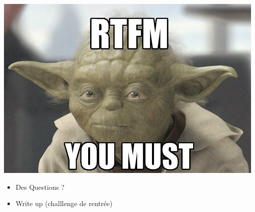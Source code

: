 \documentclass{beamer}
\begin{document}
\begin{frame}
	\centerline{\includegraphics[scale=0.9]{rtfm.png}}
\end{frame}


\begin{frame} 
	\begin{itemize}
		\item Des Questions ?
		\item Write up (challlenge de rentrée) 
	\end{itemize}
\end{frame}
\end{document}
